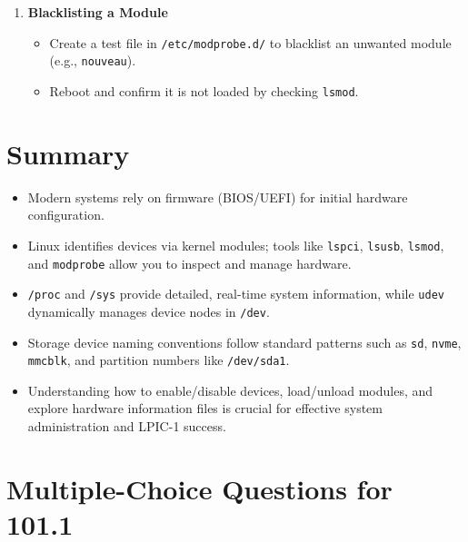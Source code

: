 \documentclass[12pt,a4paper]{report}
\begin{document}
\begin{enumerate}
\begin{itemize}
    \end{itemize}

    \item \textbf{Blacklisting a Module}
    \begin{itemize}
        \item Create a test file in \texttt{/etc/modprobe.d/} to blacklist an unwanted module (e.g., \texttt{nouveau}).
        \item Reboot and confirm it is not loaded by checking \texttt{lsmod}.
    \end{itemize}
\end{enumerate}

\section*{Summary}
\begin{itemize}
    \item Modern systems rely on firmware (BIOS/UEFI) for initial hardware configuration.
    \item Linux identifies devices via kernel modules; tools like \texttt{lspci}, \texttt{lsusb}, \texttt{lsmod}, and \texttt{modprobe} allow you to inspect and manage hardware.
    \item \texttt{/proc} and \texttt{/sys} provide detailed, real-time system information, while \texttt{udev} dynamically manages device nodes in \texttt{/dev}.
    \item Storage device naming conventions follow standard patterns such as \texttt{sd}, \texttt{nvme}, \texttt{mmcblk}, and partition numbers like \texttt{/dev/sda1}.
    \item Understanding how to enable/disable devices, load/unload modules, and explore hardware information files is crucial for effective system administration and LPIC-1 success.
\end{itemize}




\newpage
\section*{Multiple-Choice Questions for 101.1}
\end{document}
